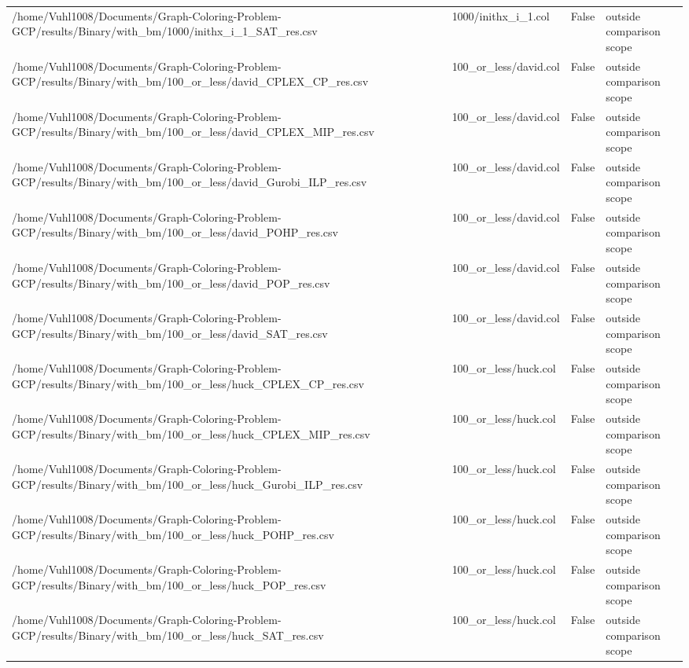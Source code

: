 \begin{table}[htbp]
\begin{tabular}{llll}
/home/Vuhl1008/Documents/Graph-Coloring-Problem-GCP/results/Binary/with\_bm/1000/inithx\_i\_1\_SAT\_res.csv & 1000/inithx\_i\_1.col & False & outside comparison scope \\
/home/Vuhl1008/Documents/Graph-Coloring-Problem-GCP/results/Binary/with\_bm/100\_or\_less/david\_CPLEX\_CP\_res.csv & 100\_or\_less/david.col & False & outside comparison scope \\
/home/Vuhl1008/Documents/Graph-Coloring-Problem-GCP/results/Binary/with\_bm/100\_or\_less/david\_CPLEX\_MIP\_res.csv & 100\_or\_less/david.col & False & outside comparison scope \\
/home/Vuhl1008/Documents/Graph-Coloring-Problem-GCP/results/Binary/with\_bm/100\_or\_less/david\_Gurobi\_ILP\_res.csv & 100\_or\_less/david.col & False & outside comparison scope \\
/home/Vuhl1008/Documents/Graph-Coloring-Problem-GCP/results/Binary/with\_bm/100\_or\_less/david\_POHP\_res.csv & 100\_or\_less/david.col & False & outside comparison scope \\
/home/Vuhl1008/Documents/Graph-Coloring-Problem-GCP/results/Binary/with\_bm/100\_or\_less/david\_POP\_res.csv & 100\_or\_less/david.col & False & outside comparison scope \\
/home/Vuhl1008/Documents/Graph-Coloring-Problem-GCP/results/Binary/with\_bm/100\_or\_less/david\_SAT\_res.csv & 100\_or\_less/david.col & False & outside comparison scope \\
/home/Vuhl1008/Documents/Graph-Coloring-Problem-GCP/results/Binary/with\_bm/100\_or\_less/huck\_CPLEX\_CP\_res.csv & 100\_or\_less/huck.col & False & outside comparison scope \\
/home/Vuhl1008/Documents/Graph-Coloring-Problem-GCP/results/Binary/with\_bm/100\_or\_less/huck\_CPLEX\_MIP\_res.csv & 100\_or\_less/huck.col & False & outside comparison scope \\
/home/Vuhl1008/Documents/Graph-Coloring-Problem-GCP/results/Binary/with\_bm/100\_or\_less/huck\_Gurobi\_ILP\_res.csv & 100\_or\_less/huck.col & False & outside comparison scope \\
/home/Vuhl1008/Documents/Graph-Coloring-Problem-GCP/results/Binary/with\_bm/100\_or\_less/huck\_POHP\_res.csv & 100\_or\_less/huck.col & False & outside comparison scope \\
/home/Vuhl1008/Documents/Graph-Coloring-Problem-GCP/results/Binary/with\_bm/100\_or\_less/huck\_POP\_res.csv & 100\_or\_less/huck.col & False & outside comparison scope \\
/home/Vuhl1008/Documents/Graph-Coloring-Problem-GCP/results/Binary/with\_bm/100\_or\_less/huck\_SAT\_res.csv & 100\_or\_less/huck.col & False & outside comparison scope \\

\end{tabular}
\end{table}
